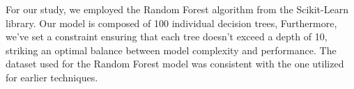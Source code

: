 For our study, we employed the Random Forest algorithm from the Scikit-Learn library. Our model is composed of 100 individual decision trees, Furthermore, we've set a constraint ensuring that each tree doesn't exceed a depth of 10, striking an optimal balance between model complexity and performance.
The dataset used for the Random Forest model was consistent with the one utilized for earlier techniques.






